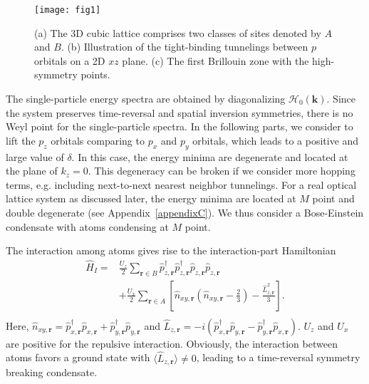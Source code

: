 \documentclass[aps,pra,floatfix,twocolumn,superscriptaddress]{revtex4-1}
\begin{document}
\begin{figure}[tpb]
	\centering
	\texttt{[image: fig1]}
	\caption{(a) The 3D cubic lattice comprises two classes of sites denoted by $A$ and $B$. (b) Illustration of the tight-binding tunnelings between $p$ orbitals on a 2D $xz$ plane. (c) The first Brillouin zone with the high-symmetry points.}
	\label{fig1}
\end{figure}

The single-particle energy spectra are obtained by diagonalizing $\mathcal{H}_0( \mathbf{k})$. 
Since the system preserves time-reversal and spatial inversion symmetries, there is no Weyl point for the single-particle spectra. In the following parts, we consider to lift the $p_z$ orbitals comparing to $p_x$ and $p_y$ orbitals, which leads to a positive and large value of $\delta$. In this case, the energy minima are degenerate and located at the plane of $k_z=0$. This degeneracy can be broken if we consider more hopping terms, e.g. including next-to-next nearest neighbor tunnelings. For a real optical lattice system as discussed later, the energy minima are located at $M$ point and double degenerate (see Appendix~\ref{appendixC}). We thus consider a Bose-Einstein condensate with atoms condensing at $M$ point.

The interaction among atoms gives rise to the interaction-part Hamiltonian
\begin{equation}
\begin{aligned}
	\hat{H}_I =&\frac{U_{z}}{2}\sum_{\mathbf{r}\in B} \hat{p}_{z,\mathbf{r}}^\dagger\hat{p}_{z,\mathbf{r}}^\dagger\hat{p}_{z,\mathbf{r}}\hat{p}_{z,\mathbf{r}}\\
	&+ \frac{U_{x}}{2}\sum_{\mathbf{r}\in A}\left[ \hat{n}_{xy,\mathbf{r}}\left( \hat{n}_{xy,\mathbf{r}}-\frac{2}{3}\right)-\frac{\hat{L}^2_{z,\mathbf{r}}}{3}\right].\\
\end{aligned}
\end{equation}
Here, $\hat{n}_{xy,\mathbf{r}}=\hat{p}_{x,\mathbf{r}}^\dagger\hat{p}_{x,\mathbf{r}}+\hat{p}_{y,\mathbf{r}}^\dagger\hat{p}_{y,\mathbf{r}}$ and $\hat{L}_{z,\mathbf{r}}=-i(\hat{p}_{x,\mathbf{r}}^\dagger\hat{p}_{y,\mathbf{r}}-\hat{p}_{y,\mathbf{r}}^\dagger\hat{p}_{x,\mathbf{r}})$. $U_{z}$ and $U_{x}$ are positive for the repulsive interaction. Obviously, the interaction between atoms favors a ground state with $\langle \hat{L}_{z,\mathbf{r}} \rangle \neq 0$, leading to a time-reversal symmetry breaking condensate.
\end{document}
